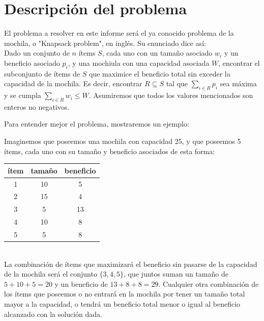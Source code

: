 \documentclass[10pt, a4paper]{article}
\begin{document}


\maketitle

\tableofcontents

\pagebreak


\section{Descripci\'on del problema}

El problema a resolver en este informe será el ya conocido problema de la mochila, o "Knapsack problem", en inglés. Su enunciado dice así: \\
Dado un conjunto de $n$ ítems $S$, cada uno con un tamaño asociado $w_i$ y un beneficio asociado $p_i$, y una mochiula con una capacidad asociada $W$, encontrar el subconjunto de ítems de $S$ que maximice el beneficio total sin exceder la capacidad de la mochila. Es decir, encontrar $R \subseteq S$ tal que $\sum_{i \in R} p_i$ sea máxima y se cumpla $\sum_{i \in R} w_i \leq W$. Asumiremos que todos los valores mencionados son enteros no negativos.\par

Para entender mejor el problema, mostraremos un ejemplo: \par
Imaginemos que poseemos una mochila con capacidad 25, y que poseemos 5 ítems, cada uno con su tamaño y beneficio asociados de esta forma: \\
\begin{tabular}{c|c|c}
	ítem & tamaño & beneficio \\ \hline
	1 & 10 & 5 \\
	2 & 15 & 4 \\
	3 & 5 & 13 \\
	4 & 10 & 8 \\
	5 & 5 & 8
\end{tabular} \\
La combinación de ítems que maximizará el beneficio sin pasarse de la capacidad de la mochila será el conjunto $\{3, 4, 5\}$, que juntos suman un tamaño de $5 + 10 + 5 = 20$ y un beneficio de $13 + 8 + 8 = 29$. Cualquier otra combinación de los ítems que poseemos o no entrará en la mochila por tener un tamaño total mayor a la capacidad, o tendrá un beneficio total menor o igual al beneficio alcanzado con la solución dada. \par
\end{document}
